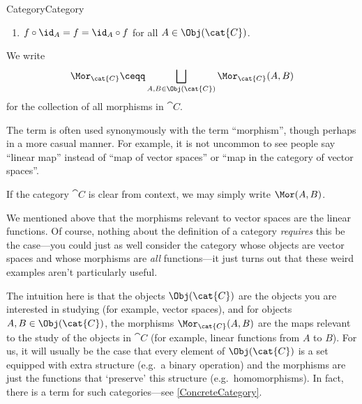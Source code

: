 \begin{dfn}{Category}{Category}
\begin{enumerate}
\item $f\circ \id _A=f=\id _A\circ f$ for all $A\in \Obj (\cat{C})$.
\end{enumerate}
\begin{rmk}
We write
\begin{equation}
\Mor _{\cat{C}}\ceqq \bigsqcup _{A,B\in \Obj (\cat{C})}\Mor _{\cat{C}}(A,B)
\end{equation}
for the collection of all morphisms in $\cat{C}$.
\end{rmk}
\begin{rmk}
The term  is often used synonymously with the term ``morphism'', though perhaps in a more casual manner.  For example, it is not uncommon to see people say ``linear map'' instead of ``map of vector spaces'' or ``map in the category of vector spaces''.
\end{rmk}
\begin{rmk}
If the category $\cat{C}$ is clear from context, we may simply write $\Mor (A,B)$.
\end{rmk}
\begin{rmk}
We mentioned above that the morphisms relevant to vector spaces are the linear functions.  Of course, nothing about the definition of a category \emph{requires} this be the case---you could just as well consider the category whose objects are vector spaces and whose morphisms are \emph{all} functions---it just turns out that these weird examples aren't particularly useful.
\end{rmk}
\end{dfn}
The intuition here is that the objects $\Obj (\cat{C})$ are the objects you are interested in studying (for example, vector spaces), and for objects $A,B\in \Obj (\cat{C})$, the morphisms $\Mor _{\cat{C}}(A,B)$ are the maps relevant to the study of the objects in $\cat{C}$ (for example, linear functions from $A$ to $B$).  For us, it will usually be the case that every element of $\Obj (\cat{C})$ is a set equipped with extra structure (e.g.~a binary operation) and the morphisms are just the functions that `preserve' this structure (e.g.~homomorphisms).  In fact, there is a term for such categories---see \cref{ConcreteCategory}.

